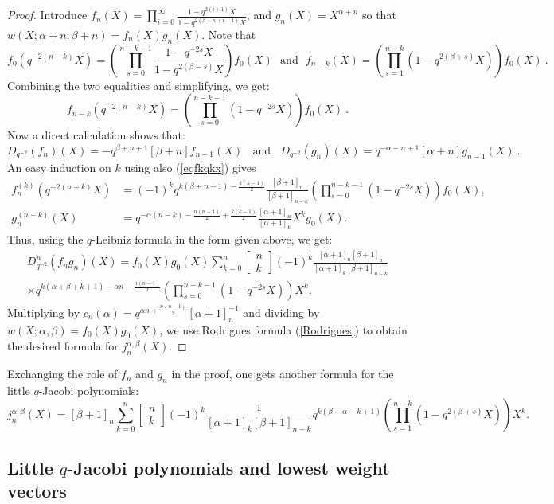 \documentclass[a4paper,12pt]{article}
\numberwithin{equation}{section}
\newcommand{\qbinom}[2]{\begin{bmatrix}#1\\#2\end{bmatrix}}
\theoremstyle{rem}
\newenvironment{rema}
  {\pushQED{\qed}\renewcommand{\qedsymbol}{$\scriptstyle{\blacktriangle}$}\remax}
  {\popQED\endremax}
\theoremstyle{definition}
\begin{document}
\begin{proof}
Introduce $f_n(X)=\prod_{i=0}^\infty \frac{1-q^{2(i+1)}X}{1-q^{2(\beta+n+i+1)}X}$, and $g_n(X)=X^{\alpha+n}$ so that $w(X; \alpha+n;\beta+n)=f_n(X)g_n(X)$.
Note that
\[f_0(q^{-2(n-k)}X)=\left(\prod_{s=0}^{n-k-1}\frac{1-q^{-2s}X}{1-q^{2(\beta-s)}X}\right)f_0(X)\ \ \ \text{and}\ \ \ f_{n-k}(X)=\left(\prod_{s=1}^{n-k}(1-q^{2(\beta+s)}X)\right)f_0(X)\ .\]
Combining the two equalities and simplifying, we get:
\begin{equation}\label{eqfkqkx}f_{n-k}(q^{-2(n-k)}X)=\left(\prod_{s=0}^{n-k-1}(1-q^{-2s}X)\right)f_0(X)\ .\end{equation}
Now a direct calculation shows that:
\[D_{q^{-2}}(f_n)(X)=-q^{\beta+n+1}[\beta+n]f_{n-1}(X)\ \ \ \ \text{and}\ \ \ \ D_{q^{-2}}(g_n)(X)=q^{-\alpha-n+1}[\alpha+n]g_{n-1}(X)\ .\]
An easy induction on $k$ using also (\ref{eqfkqkx}) gives
\begin{align*}
f_n^{(k)}(q^{-2(n-k)}X)&=(-1)^{k} q^{k(\beta+n+1)-\frac{k(k-1)}{2}}\frac{[\beta+1]_n}{[\beta+1]_{n-k}}\left(\prod_{s=0}^{n-k-1}(1-q^{-2s}X)\right)f_0(X),\\
g_n^{(n-k)}(X)&=q^{-\alpha(n-k)-\frac{n(n-1)}{2}+\frac{k(k-1)}{2}} \frac{[\alpha+1]_n}{[\alpha+1]_{k}}X^{k}g_{0}(X).
\end{align*}
Thus, using the $q$-Leibniz formula in the form given above, we get:
\begin{multline*}
D_{q^{-2}}^n(f_ng_n)(X)=f_0(X)g_0(X) \sum_{k=0}^n \qbinom{n}{k}(-1)^{k} \frac{[\alpha+1]_n[\beta+1]_n}{[\alpha+1]_{k}[\beta+1]_{n-k}}\\
\times q^{k(\alpha+\beta+k+1) -\alpha n-\frac{n(n-1)}{2}}\left(\prod_{s=0}^{n-k-1}(1-q^{-2s}X)\right)X^k.
\end{multline*}
Multiplying by $c_n(\alpha)=q^{\alpha n+\frac{n(n-1)}{2}}[\alpha+1]_n^{-1}$ and dividing by $w(X;\alpha,\beta)=f_0(X)g_0(X)$, we use Rodrigues formula (\ref{Rodrigues}) to obtain the desired formula for $j_n^{\alpha,\beta}(X)$.
\end{proof}
\begin{rema}
Exchanging the role of $f_n$ and $g_n$ in the proof, one gets another formula for the little $q$-Jacobi polynomials:
    \begin{equation*}
    j_n^{\alpha,\beta}(X)=[\beta+1]_n\sum_{k=0}^n \qbinom{n}{k}(-1)^k \frac{1}{[\alpha+1]_k[\beta+1]_{n-k}} q^{k(\beta-\alpha-k+1)}\left(\prod_{s=1}^{n-k}(1-q^{2(\beta+s)}X)\right)X^k.
    \end{equation*}
\end{rema}


\subsection{Little $q$-Jacobi polynomials and lowest weight vectors}
\end{document}
